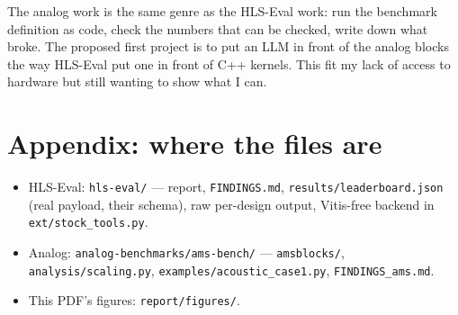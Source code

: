 \documentclass[11pt]{article}
\newcommand{\code}[1]{\texttt{#1}}
\begin{document}
The analog work is the same genre as the HLS-Eval work: run the
benchmark definition as code, check the numbers that can be checked,
write down what broke. The proposed first project is to put an LLM in
front of the analog blocks the way HLS-Eval put one in front of C++
kernels. This fit my lack of access to hardware but still wanting to show what I can. 

\section*{Appendix: where the files are}

\begin{itemize}
\item HLS-Eval: \code{hls-eval/} --- report, \code{FINDINGS.md},
\code{results/leaderboard.json} (real payload, their schema), raw
per-design output, Vitis-free backend in \code{ext/stock\_tools.py}.
\item Analog: \code{analog-benchmarks/ams-bench/} ---
\code{amsblocks/}, \code{analysis/scaling.py},
\code{examples/acoustic\_case1.py}, \code{FINDINGS\_ams.md}.
\item This PDF's figures: \code{report/figures/}.
\end{itemize}
\end{document}
